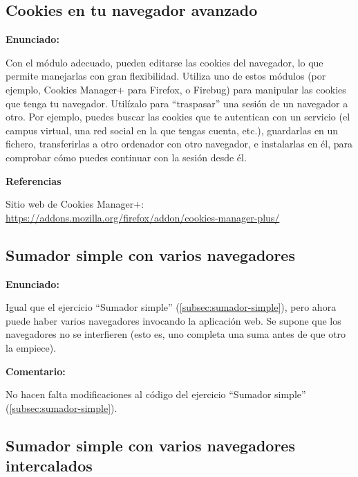 \subsection{Cookies en tu navegador avanzado}
\label{subsec:cookies-navegador-2}

\textbf{Enunciado:}

Con el módulo adecuado, pueden editarse las cookies del navegador, lo que permite manejarlas con gran flexibilidad. Utiliza uno de estos módulos (por ejemplo, Cookies Manager$+$ para Firefox, o Firebug) para manipular las cookies que tenga tu navegador. Utilízalo para ``traspasar'' una sesión de un navegador a otro. Por ejemplo, puedes buscar las cookies que te autentican con un servicio (el campus virtual, una red social en la que tengas cuenta, etc.), guardarlas en un fichero, transferirlas a otro ordenador con otro navegador, e instalarlas en él, para comprobar cómo puedes continuar con la sesión desde él.

\textbf{Referencias}

Sitio web de Cookies Manager$+$: \url{https://addons.mozilla.org/firefox/addon/cookies-manager-plus/}


\subsection{Sumador simple con varios navegadores}
\label{subsec:sumador-simple-varios}

\textbf{Enunciado:}

Igual que el ejercicio ``Sumador simple'' (\ref{subsec:sumador-simple}), pero ahora puede haber varios navegadores invocando la aplicación web. Se supone que los navegadores no se interfieren (esto es, uno completa una suma antes de que otro la empiece).

\textbf{Comentario:}

No hacen falta modificaciones al código del ejercicio ``Sumador simple'' (\ref{subsec:sumador-simple}).


\subsection{Sumador simple con varios navegadores intercalados}
\label{subsec:sumador-simple-varios-intercalados}

